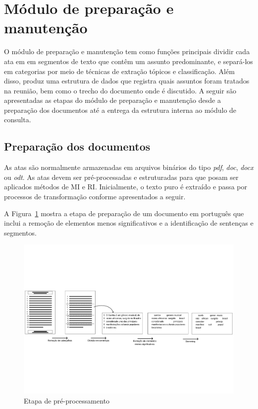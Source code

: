 \section{Módulo de preparação e manutenção}

O módulo de preparação e manutenção tem como funções principais dividir cada ata em em segmentos de texto que contêm um assunto predominante, e separá-los em categorias por meio de técnicas de extração tópicos e classificação. Além disso, produz uma estrutura de dados que registra quais assuntos foram tratados na reunião, bem como o trecho do documento onde é discutido.  
A seguir são apresentadas as etapas do módulo de preparação e manutenção desde a preparação dos documentos até a entrega da estrutura interna ao módulo de consulta. 


\subsection{Preparação dos documentos}

As atas são normalmente armazenadas em arquivos binários do tipo \textit{pdf}, \textit{doc}, \textit{docx} ou \textit{odt}. As atas devem ser pré-processadas e estruturadas para que posam ser aplicados métodos de MI e RI. Inicialmente, o texto puro é extraído e passa por processos de transformação conforme apresentados a seguir.

A Figura~\ref{fig:exemplopreprocessamento} mostra a etapa de preparação de um documento em português que inclui a remoção de elementos menos significativos e a identificação de sentenças e segmentos.
	

\begin{center}
	\begin{figure}

	\includegraphics[trim={ 0 180 0 180 },clip,page=1,width=\textwidth]{conteudo/capitulos/figs/pre-process.pdf}

	\caption{Etapa de pré-processamento}
	\label{fig:exemplopreprocessamento}
	\end{figure}
\end{center}






